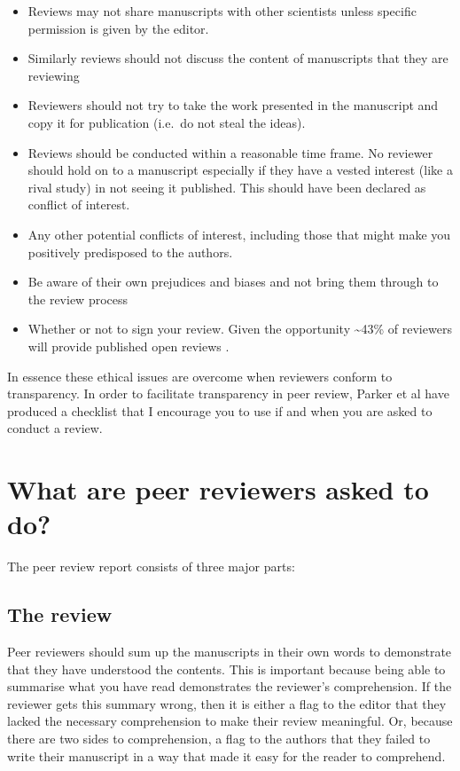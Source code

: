 \documentclass[
]{krantz}
\providecommand{\tightlist}{%
  \setlength{\itemsep}{0pt}\setlength{\parskip}{0pt}}
\begin{document}
\begin{itemize}
\tightlist
\item
  Reviews may not share manuscripts with other scientists unless specific permission is given by the editor.
\item
  Similarly reviews should not discuss the content of manuscripts that they are reviewing
\item
  Reviewers should not try to take the work presented in the manuscript and copy it for publication (i.e.~do not steal the ideas).
\item
  Reviews should be conducted within a reasonable time frame. No reviewer should hold on to a manuscript especially if they have a vested interest (like a rival study) in not seeing it published. This should have been declared as conflict of interest.
\item
  Any other potential conflicts of interest, including those that might make you positively predisposed to the authors.
\item
  Be aware of their own prejudices and biases and not bring them through to the review process
\item
  Whether or not to sign your review. Given the opportunity \textasciitilde43\% of reviewers will provide published open reviews \citep{wang2016open}.
\end{itemize}

In essence these ethical issues are overcome when reviewers conform to transparency. In order to facilitate transparency in peer review, Parker et al \citeyearpar{parker2018empowering} have produced a checklist that I encourage you to use if and when you are asked to conduct a review.

\hypertarget{what-are-peer-reviewers-asked-to-do}{%
\section{What are peer reviewers asked to do?}\label{what-are-peer-reviewers-asked-to-do}}

The peer review report consists of three major parts:

\hypertarget{the-review}{%
\subsection{The review}\label{the-review}}

Peer reviewers should sum up the manuscripts in their own words to demonstrate that they have understood the contents. This is important because being able to summarise what you have read demonstrates the reviewer's comprehension. If the reviewer gets this summary wrong, then it is either a flag to the editor that they lacked the necessary comprehension to make their review meaningful. Or, because there are two sides to comprehension, a flag to the authors that they failed to write their manuscript in a way that made it easy for the reader to comprehend.
\end{document}
